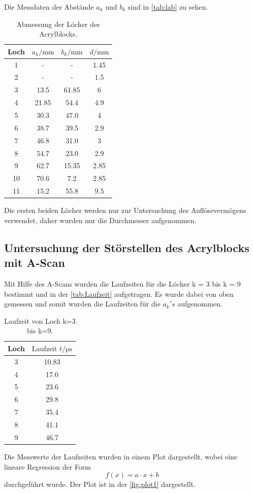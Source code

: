 Die Messdaten der Abstände $a_k$ und $b_k$ sind in \autoref{tab:lab} zu sehen. 
\begin{table}[H]
    \centering
    \caption{Abmessung der Löcher des Acrylblocks.}
    \label{tab:lab}
\begin{tabular}{c c c c}
    \toprule
    Loch & $a_k / \si{\milli\meter}$ & $b_k / \si{\milli\meter}$ & $d / \si{\milli\meter}$\\
    \midrule
    1 &   -  &    -   & 1.45 \\
    2 &   -  &    -   & 1.5 \\
    3 & 13.5 & 61.85 &    6  \\
    4 &21.85 &  54.4 &  4.9  \\
    5 &30.3 &  47.0 &    4  \\
    6 & 38.7 &  39.5 &  2.9  \\
    7 &46.8 &  31.0 &    3  \\
    8 &54.7 &  23.0 &  2.9  \\
    9 & 62.7 & 15.35 & 2.85  \\
    10 & 70.6 &   7.2 & 2.85  \\
    11 &15.2 &  55.8 &  9.5 \\
    \bottomrule
    \end{tabular}
\end{table}
Die ersten beiden Löcher werden nur zur Untersuchung des Auflösevermögens verwendet, daher wurden nur die Durchmesser aufgenommen.

\subsection{Untersuchung der Störstellen des Acrylblocks mit A-Scan}
\label{Untersuchung der Störstellen des Aceylblocks mit A-Scan}
Mit Hilfe des A-Scans wurden die Laufzeiten für die Löcher k = 3 bis k = 9 bestimmt und in der 
\autoref{tab:Laufzeit} aufgetragen. Es wurde dabei von oben gemessen und somit wurden die Laufzeiten für die
$a_k's$ aufgenommen. 
\begin{table}[H]
    \centering
    \caption{Laufzeit von Loch k=3 bis k=9.}
    \label{tab:Laufzeit}
\begin{tabular}{c c}
    \toprule
    Loch & $\text{Laufzeit } t / \si{\micro\second} $\\
    \midrule
     3 & 10.83 \\
     4 &  17.0 \\
     5 &  23.6 \\
     6 &  29.8 \\
     7 &  35.4 \\
     8 &  41.1 \\
     9 &  46.7 \\
    \bottomrule
\end{tabular}
\end{table}
Die Messwerte der Laufzeiten wurden in einem Plot dargestellt, wobei eine lineare Regression der Form 
\begin{equation*}
   f(x) = a \cdot x + b
\end{equation*}
durchgeführt wurde. Der Plot ist in der \autoref{fig:plot1} dargestellt.

